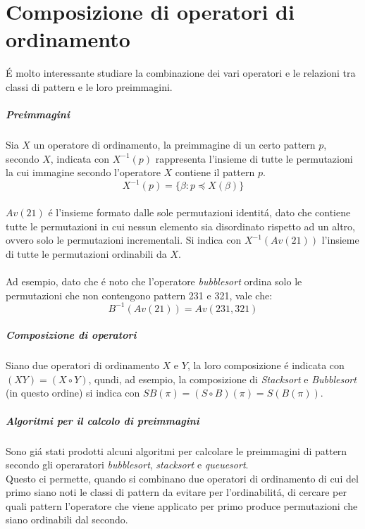 \chapter{Composizione di operatori di ordinamento}
\'E molto interessante studiare la combinazione dei vari operatori e le relazioni tra classi di pattern e le loro preimmagini.
\paragraph*{Preimmagini} Sia $X$ un operatore di ordinamento, la preimmagine di un certo pattern $p$, secondo $X$, indicata con $X^{-1}(p)$ rappresenta l'insieme di tutte le permutazioni la cui immagine secondo l'operatore $X$ contiene il pattern $p$.$$X^{-1}(p) = \{\beta : p\preceq X(\beta)\}$$\\
$Av(21)$ \'e l'insieme formato dalle sole permutazioni identit\'a, dato che contiene tutte le permutazioni in cui nessun elemento sia disordinato rispetto ad un altro, ovvero solo le permutazioni incrementali. Si indica con $X^{-1}(Av(21))$ l'insieme di tutte le permutazioni ordinabili da $X$.\\\\
Ad esempio, dato che \'e noto che l'operatore \textit{bubblesort} ordina solo le permutazioni che non contengono pattern 231 e 321, vale che:$$B^{-1}(Av(21)) = Av(231,321)$$
\paragraph*{Composizione di operatori} Siano due operatori di ordinamento $X$ e $Y$, la loro composizione \'e indicata con $( XY ) = ( X \circ Y )$, qundi, ad esempio, la composizione di \textit{Stacksort} e \textit{Bubblesort} (in questo ordine) si indica con $SB(\pi) = (S \circ B)(\pi) = S(B(\pi))$.
\paragraph*{Algoritmi per il calcolo di preimmagini} Sono gi\'a stati prodotti alcuni algoritmi per calcolare le preimmagini di pattern secondo gli operaratori \textit{bubblesort}\cite{albert2010inverse}, \textit{stacksort}\cite{claesson2012sorting} e \textit{queuesort}\cite{magnusson2013sorting}\cite{cioni2021characterization}.\\
Questo ci permette, quando si combinano due operatori di ordinamento di cui del primo siano noti le classi di pattern da evitare per l'ordinabilit\'a, di cercare per quali pattern l'operatore che viene applicato per primo produce permutazioni che siano ordinabili dal secondo.
